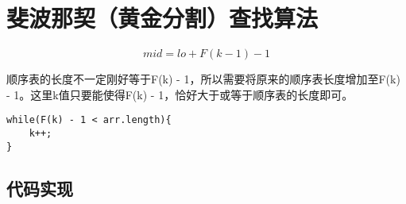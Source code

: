 \documentclass[a4paper]{report}
\begin{document}
\section{斐波那契（黄金分割）查找算法}
\begin{equation*}
mid = lo + F(k - 1) - 1
\end{equation*}

顺序表的长度不一定刚好等于F(k) - 1，所以需要将原来的顺序表长度增加至F(k) - 1。这里k值只要能使得F(k) - 1，恰好大于或等于顺序表的长度即可。
\begin{lstlisting}
while(F(k) - 1 < arr.length){
    k++;
}
\end{lstlisting}

\subsection{代码实现}
\end{document}
